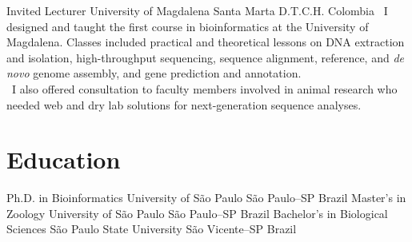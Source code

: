 \documentclass[11pt, a4, sans]{moderncv}
\begin{document}
    	{Invited Lecturer}
    	{University of Magdalena}
    	{Santa Marta D.T.C.H.}
    	{Colombia}
    	{
    	    \textbullet~I designed and taught the first course in bioinformatics at the University of Magdalena. Classes included practical and theoretical lessons on DNA extraction and isolation, high-throughput sequencing, sequence alignment, reference, and \textit{de novo} genome assembly, and gene prediction and annotation.\\
    	    \textbullet~I also offered consultation to faculty members involved in animal research who needed web and dry lab solutions for next-generation sequence analyses.
    	}



\section{Education}
		{Ph.D. in Bioinformatics}
		{University of São Paulo}
		{São Paulo--SP}
		{Brazil}
		{}
		{Master's in Zoology}
		{University of São Paulo}
		{São Paulo--SP}
		{Brazil}
		{}
		{Bachelor's in Biological Sciences}
		{São Paulo State University}
		{São Vicente--SP}
		{Brazil}
		{}




\end{document}
